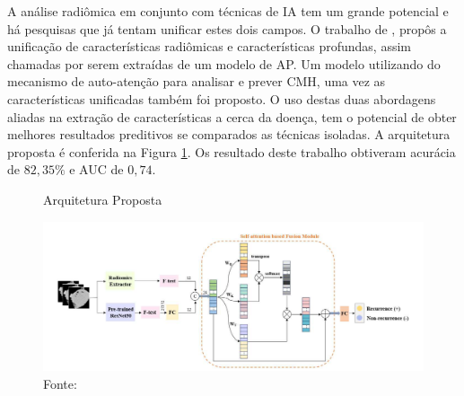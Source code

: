 

A análise radiômica em conjunto com técnicas de \gls{IA} tem um grande potencial e há pesquisas que já tentam unificar estes dois campos. O trabalho de , propôs a unificação de características radiômicas e características profundas, assim chamadas por serem extraídas de um modelo de \gls{AP}. Um modelo utilizando do mecanismo de auto-atenção para analisar e prever \gls{CMH}, uma vez as características unificadas também foi proposto. O uso destas duas abordagens aliadas na extração de características a cerca da doença, tem o potencial de obter melhores resultados preditivos se comparados as técnicas isoladas. A arquitetura proposta é conferida na Figura \ref{fig:fig006}. Os resultado deste trabalho obtiveram acurácia de $82,35\%$ e AUC de $0,74$.

\begin{figure}[ht]
    \centering
    \captionsetup{justification=centering}
    \caption{Arquitetura Proposta}
    \includegraphics[width=1\textwidth]{figures/fig006.png}
    \caption*{Fonte: \cite{aiSelfAttentionBasedFusion2023}}
    \label{fig:fig006}
\end{figure}



